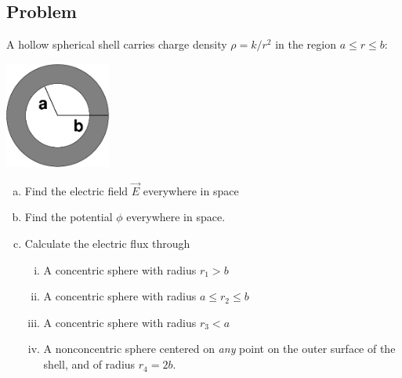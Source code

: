 \documentclass[solutions]{esg8022pset}
\begin{document}
\subsection{Problem}
  A hollow spherical shell carries charge density $\rho = k/r^2$ in the
  region $a \le r \le b$:
  \begin{center}\includegraphics[width=3.5cm]{ps03_09}\end{center}
  \begin{enumerate}[(a)]
    \item Find the electric field $\vec E$ everywhere in space
    \item Find the potential $\phi$ everywhere in space.
    \item Calculate the electric flux through
      \begin{enumerate}[(i)]
        \item A concentric sphere with radius $r_1 > b$
        \item A concentric sphere with radius $a \le r_2 \le b$
        \item A concentric sphere with radius $r_3 < a$
        \item A nonconcentric sphere centered on \emph{any} point on the
          outer surface of the shell, and of radius $r_4 = 2b$.
      \end{enumerate}
  \end{enumerate}
\end{document}
